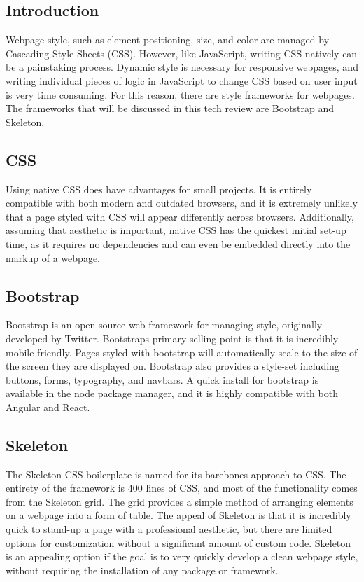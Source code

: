 \documentclass[onecolumn, draftclsnofoot,10pt, compsoc]{report}
\begin{document}
\subsection{Introduction}
Webpage style, such as element positioning, size, and color are managed by Cascading Style Sheets (CSS). However,
like JavaScript, writing CSS natively can be a painstaking process. Dynamic style is necessary for responsive webpages,
and writing individual pieces of logic in JavaScript to change CSS based on user input is very time consuming. For
this reason, there are style frameworks for webpages. The frameworks that will be discussed in this tech review are
Bootstrap and Skeleton.
\subsection{CSS}
Using native CSS does have advantages for small projects. It is entirely compatible with both modern and outdated
browsers, and it is extremely unlikely that a page styled with CSS will appear differently across browsers. Additionally,
assuming that aesthetic is important, native CSS has the quickest initial set-up time, as it requires no dependencies and
can even be embedded directly into the markup of a webpage.
\subsection{Bootstrap}
Bootstrap is an open-source web framework for managing style, originally developed by Twitter. Bootstraps primary
selling point is that it is incredibly mobile-friendly. Pages styled with bootstrap will automatically scale to the size of the
screen they are displayed on. Bootstrap also provides a style-set including buttons, forms, typography, and navbars. A
quick install for bootstrap is available in the node package manager, and it is highly compatible with both Angular and
React.
\subsection{Skeleton}
The Skeleton CSS boilerplate is named for its barebones approach to CSS. The entirety of the framework is 400 lines
of CSS, and most of the functionality comes from the Skeleton grid. The grid provides a simple method of arranging
elements on a webpage into a form of table. The appeal of Skeleton is that it is incredibly quick to stand-up a page
with a professional aesthetic, but there are limited options for customization without a significant amount of custom
code. Skeleton is an appealing option if the goal is to very quickly develop a clean webpage style, without requiring the
installation of any package or framework.
\end{document}
